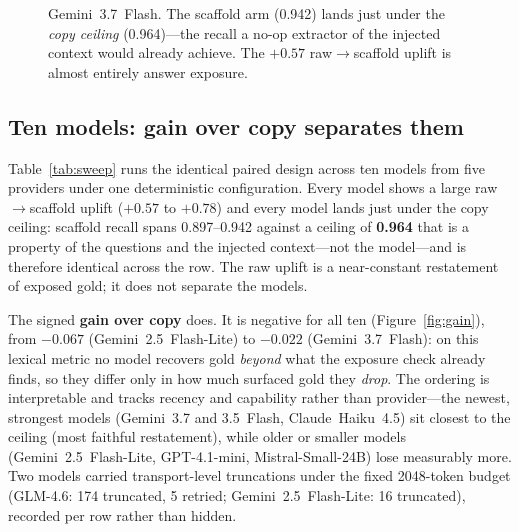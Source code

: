 \documentclass[11pt]{article}
\begin{document}
\begin{figure}[t]\centering
{}
\caption{Gemini~3.7~Flash. The scaffold arm (0.942) lands just under the \emph{copy ceiling}
(0.964)---the recall a no-op extractor of the injected context would already achieve. The
$+0.57$ raw$\to$scaffold uplift is almost entirely answer exposure.}
\label{fig:anchor}
\end{figure}

\subsection{Ten models: gain over copy separates them}\label{sec:multi-model}
Table~\ref{tab:sweep} runs the identical paired design across ten models from five providers under
one deterministic configuration. Every model shows a large raw$\to$scaffold uplift
($+0.57$ to $+0.78$) and every model lands just under the copy ceiling: scaffold recall spans
0.897--0.942 against a ceiling of \textbf{0.964} that is a property of the questions and the
injected context---not the model---and is therefore identical across the row. The raw uplift is a
near-constant restatement of exposed gold; it does not separate the models.

The signed \textbf{gain over copy} does. It is negative for all ten (Figure~\ref{fig:gain}), from
$-0.067$ (Gemini~2.5~Flash-Lite) to $-0.022$ (Gemini~3.7~Flash): on this lexical metric no model
recovers gold \emph{beyond} what the exposure check already finds, so they differ only in how much
surfaced gold they \emph{drop}. The ordering is interpretable and tracks recency and capability
rather than provider---the newest, strongest models (Gemini~3.7 and 3.5~Flash, Claude~Haiku~4.5)
sit closest to the ceiling (most faithful restatement), while older or smaller models
(Gemini~2.5~Flash-Lite, GPT-4.1-mini, Mistral-Small-24B) lose measurably more. Two models carried
transport-level truncations under the fixed 2048-token budget (GLM-4.6: 174 truncated, 5 retried;
Gemini~2.5~Flash-Lite: 16 truncated), recorded per row rather than hidden.
\end{document}
